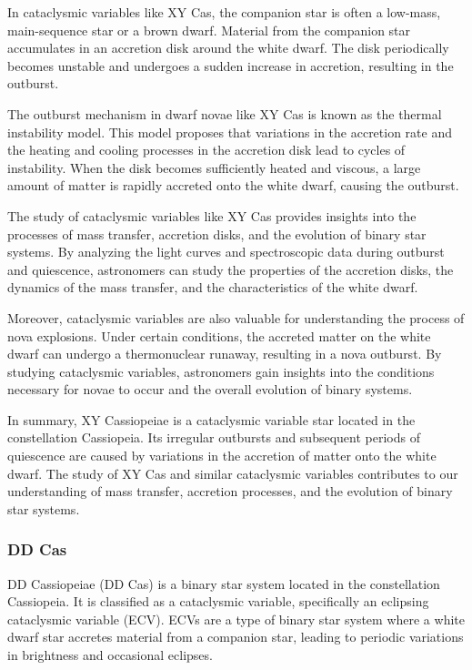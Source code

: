 In cataclysmic variables like XY Cas, the companion star is often a low-mass, main-sequence star or a brown dwarf. Material from the companion star accumulates in an accretion disk around the white dwarf. The disk periodically becomes unstable and undergoes a sudden increase in accretion, resulting in the outburst.

The outburst mechanism in dwarf novae like XY Cas is known as the thermal instability model. This model proposes that variations in the accretion rate and the heating and cooling processes in the accretion disk lead to cycles of instability. When the disk becomes sufficiently heated and viscous, a large amount of matter is rapidly accreted onto the white dwarf, causing the outburst.

The study of cataclysmic variables like XY Cas provides insights into the processes of mass transfer, accretion disks, and the evolution of binary star systems. By analyzing the light curves and spectroscopic data during outburst and quiescence, astronomers can study the properties of the accretion disks, the dynamics of the mass transfer, and the characteristics of the white dwarf.

Moreover, cataclysmic variables are also valuable for understanding the process of nova explosions. Under certain conditions, the accreted matter on the white dwarf can undergo a thermonuclear runaway, resulting in a nova outburst. By studying cataclysmic variables, astronomers gain insights into the conditions necessary for novae to occur and the overall evolution of binary systems.

In summary, XY Cassiopeiae is a cataclysmic variable star located in the constellation Cassiopeia. Its irregular outbursts and subsequent periods of quiescence are caused by variations in the accretion of matter onto the white dwarf. The study of XY Cas and similar cataclysmic variables contributes to our understanding of mass transfer, accretion processes, and the evolution of binary star systems.

\subsubsection*{ DD Cas }
DD Cassiopeiae (DD Cas) is a binary star system located in the constellation Cassiopeia. It is classified as a cataclysmic variable, specifically an eclipsing cataclysmic variable (ECV). ECVs are a type of binary star system where a white dwarf star accretes material from a companion star, leading to periodic variations in brightness and occasional eclipses.

